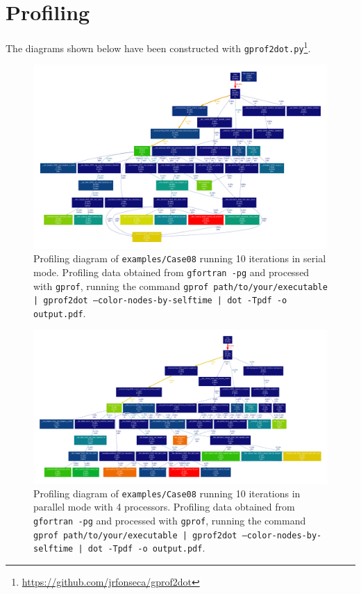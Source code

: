 \chapter{Profiling}\label{sec:profiling}

The diagrams shown below have been constructed with \texttt{gprof2dot.py}\footnote{\url{https://github.com/jrfonseca/gprof2dot}}.

\begin{figure}[!h]
  \centering
  \includegraphics[clip,width=\textwidth]{fig-profiling08.pdf}
  \caption{Profiling diagram of \texttt{examples/Case08} running 10 iterations in serial mode. Profiling data obtained from \texttt{gfortran -pg} and processed with \texttt{gprof}, running the command \texttt{gprof path/to/your/executable | gprof2dot --color-nodes-by-selftime | dot -Tpdf -o output.pdf}.}
\end{figure}

\newpage

\begin{figure}[!h]
  \centering
  \includegraphics[clip,width=\textwidth]{fig-profiling08-mpi.pdf}
  \caption{Profiling diagram of \texttt{examples/Case08} running 10 iterations in parallel mode with 4 processors. Profiling data obtained from \texttt{gfortran -pg} and processed with \texttt{gprof}, running the command \texttt{gprof path/to/your/executable | gprof2dot --color-nodes-by-selftime | dot -Tpdf -o output.pdf}.}
\end{figure}

